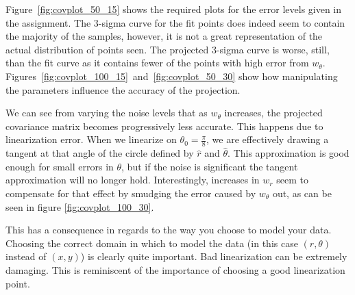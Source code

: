 \documentclass[12pt]{article}
\begin{document}
Figure~\ref{fig:covplot_50_15} shows the required plots for the error levels given
in the assignment. The 3-sigma curve for the fit points does indeed seem to contain
the majority of the samples, however, it is not a great representation of the actual distribution
of points seen. The projected 3-sigma curve is worse, still, than the fit curve as
it contains fewer of the points with high error from $w_\theta$.
Figures~\ref{fig:covplot_100_15}~and~\ref{fig:covplot_50_30} show how manipulating the
parameters influence the accuracy of the projection.

We can see from varying the noise levels that as $w_\theta$ increases, the projected
covariance matrix becomes progressively less accurate. This happens due to
linearization error. When we linearize on $\theta_0=\frac{\pi}{8}$, we are effectively
drawing a tangent at that angle of the circle defined by $\hat{r}$ and $\hat{\theta}$.
This approximation is good enough for
small errors in $\theta$, but if the noise is significant the tangent approximation
will no longer hold. Interestingly, increases in $w_r$ seem to compensate for that
effect by smudging the error caused by $w_{\theta}$ out, as can be seen in figure
\ref{fig:covplot_100_30}.

This has a consequence in regards to the way you choose to model your data.
Choosing the correct domain in which to model the data (in this case $(r,\theta)$ instead of
$(x,y)$) is clearly quite important. Bad linearization can be extremely damaging.
This is reminiscent of the importance of choosing a good linearization point.
\end{document}
